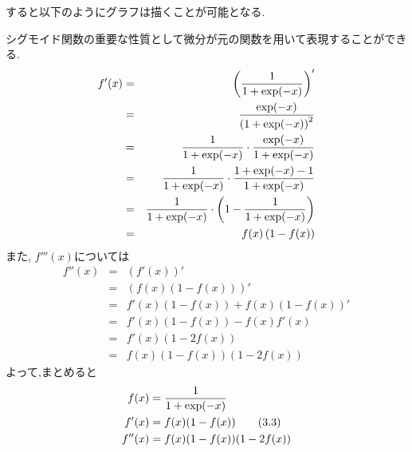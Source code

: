 \documentclass[dvipdfmx,a4j]{jsarticle}
\begin{document}
すると以下のようにグラフは描くことが可能となる.
\begin{center}
\end{center}
シグモイド関数の重要な性質として微分が元の関数を用いて表現することができる.
\begin{eqnarray*}
    f'(x)&=&\left(\frac{1}{1+{\rm exp}(-x)}\right)'\\
        &=&\frac{{\rm exp}(-x)}{\left(1+{\rm exp}(-x)\right)^{2}}\\
        &=&\frac{1}{1+{\rm exp}(-x)}\cdot \frac{{\rm exp}(-x)}{1+{\rm exp}(-x)}\\
        &=&\frac{1}{1+{\rm exp}(-x)}\cdot \frac{1+{\rm exp}(-x)-1}{1+{\rm exp}(-x)}\\
        &=&\frac{1}{1+{\rm exp}(-x)}\cdot \left(1-\frac{1}{1+{\rm exp}(-x)}\right)\\
        &=&f(x)\left(1-f(x)\right)
\end{eqnarray*}
また, $f'''(x)$については
\begin{eqnarray*}
    f''(x) &=& \left(f'(x)\right)'\\
        &=& \left(f(x)(1-f(x))\right)'\\
        &=& f'(x)(1-f(x))+f(x)(1-f(x))'\\
        &=& f'(x)(1-f(x))-f(x)f'(x)\\
        &=& f'(x)(1-2f(x))\\
        &=& f(x)(1-f(x))(1-2f(x))
\end{eqnarray*}
よって,まとめると
\begin{align*}
    f(x) &= \frac{1}{1+{\rm exp}(-x)}\\
    f'(x)&=f(x)(1-f(x)) \tag {3.3} \\
    f''(x)&=f(x)(1-f(x))(1-2f(x))
\end{align*}
\end{document}
